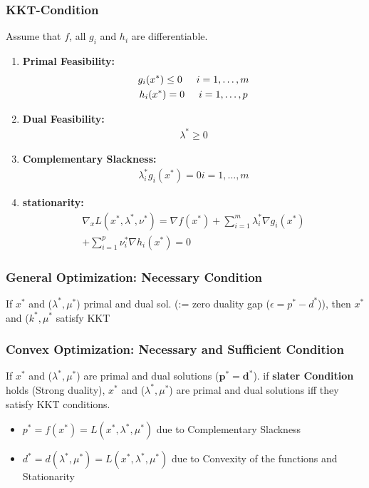 \subsubsection{KKT-Condition}
Assume that $f$, all $g_i$ and $h_i$ are differentiable.
\begin{enumerate}
    \item \textbf{Primal Feasibility:} \begin{gather*}
        g_i(x^*)\leq 0 \hspace{5mm} i = 1,\dots , m\\
        h_i(x^*) = 0 \hspace{5mm} i = 1,\dots, p
    \end{gather*}
    \item \textbf{Dual Feasibility:}
    \begin{gather*}
        \lambda^* \geq 0
    \end{gather*}
    \item\textbf{Complementary Slackness:}
    \begin{gather*}
        \lambda^*_ig_i(x^*) = 0 i = 1,\dots , m 
    \end{gather*}
    \item \textbf{stationarity:}
    \begin{gather*}
        \nabla_xL(x^*, \lambda^*, \nu^*) = \nabla f(x^*) + \sum ^m_{i=1} \lambda_i^*\nabla g_i(x^*) \\+ \sum^p_{i=1} \nu_i^*\nabla h_i (x^*) = 0
    \end{gather*}
\end{enumerate}
\subsubsection{General Optimization: Necessary Condition}
If $x^*$ and ($\lambda^*,\mu^*$) primal and dual sol. (:= zero duality gap ($\epsilon=p^*-d^*$)), then $x^*$ and ($k^*, \mu^*$ satisfy KKT
\subsubsection{Convex Optimization: Necessary and Sufficient Condition}
If $x^*$ and ($\lambda^*, \mu^*$) are primal and dual solutions ($\mathbf{p^* = d^*}$). if \textbf{slater Condition} holds (Strong duality), $x^*$ and ($\lambda^*, \mu^*$) are primal and dual solutions iff they satisfy KKT conditions.
\begin{itemize}
    \item $p^*=f(x^*) = L (x^*,\lambda^*,\mu^*)$ due to Complementary Slackness
    \item $d^* = d(\lambda^*,\mu^*) = L(x^*,\lambda^*,\mu^*)$ due to Convexity of the functions and Stationarity
\end{itemize}

